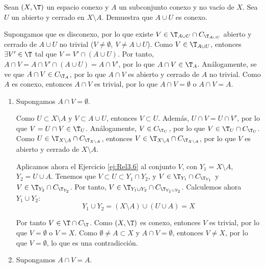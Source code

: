 \begin{ejercicio}
    Sean $(X, \T)$ un espacio conexo y $A$ un subconjunto conexo y no vacío de $X$. Sea $U$ un abierto y cerrado en $X \setminus A$. Demuestra que $A \cup U$ es conexo.

    Supongamos que es disconexo, por lo que existe $V\in \T_{A\cup U}\cap C_{\T_{A\cup U}}$ abierto y cerrado de $A\cup U$ no trivial ($V\neq \emptyset,~V\neq A\cup U$).
    Como $V\in \T_{A\cup U}$, entonces $\exists V'\in \T$ tal que $V=V'\cap (A\cup U)$. Por tanto, $A\cap V = A\cap V'\cap (A\cup U) = A\cap V'$, por lo que $A\cap V\in \T_A$.
    Análogamente, se ve que $A\cap V\in C_{\T_A}$, por lo que $A\cap V$ es abierto y cerrado de $A$ no trivial. Como $A$ es conexo, entonces $A\cap V$ es trivial, por lo que $A\cap V=\emptyset$ o $A\cap V=A$.
    \begin{enumerate}
        \item Supongamos $A\cap V=\emptyset$.
        
        Como $U\subset X\setminus A$ y $V\subset A\cup U$, entonces $V\subset U$. Además, $U\cap V = U\cap V'$, por lo que $V=U\cap V\in \T_{U}$.
        Análogamente, $V\in C_{\T_{U}}$, por lo que $V\in \T_{U}\cap C_{\T_{U}}$. Como $U\in \T_{X\setminus A}\cap C_{\T_{X\setminus A}}$,
        entonces $V\in \T_{X\setminus A}\cap C_{\T_{X\setminus A}}$, por lo que $V$ es abierto y cerrado de $X\setminus A$.

        Aplicamos ahora el Ejercicio \ref{ej:Rel3.6} al conjunto $V$, con $Y_1=X\setminus A$, $Y_2=U\cup A$. Tenemos que $V\subset U\subset Y_1 \cap Y_2$, y
        $V\in \T_{Y_1}\cap C_{\T_{Y_1}}$ y $V\in \T_{Y_2}\cap C_{\T_{Y_2}}$. Por tanto, $V\in \T_{Y_1\cup Y_2}\cap C_{\T_{Y_1\cup Y_2}}$. Calculemos ahora $Y_1\cup Y_2$:
        \begin{equation*}
            Y_1\cup Y_2 = (X\setminus A) \cup (U\cup A) = X
        \end{equation*}
        
        Por tanto $V\in \T\cap C_{\T}$. Como $(X,\T)$ es conexo, entonces $V$ es trivial, por lo que $V=\emptyset$ o $V=X$.
        Como $\emptyset \neq A \subset X$ y $A\cap V=\emptyset$, entonces $V\neq X$, por lo que $V=\emptyset$, lo que es una contradicción.

        \item Supongamos $A\cap V=A$.
        

\end{enumerate}
\end{ejercicio}
